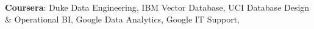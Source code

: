 \textbf{Coursera}: Duke Data Engineering, IBM Vector Database, UCI Database Design \& Operational BI, Google Data Analytics, Google IT Support, 